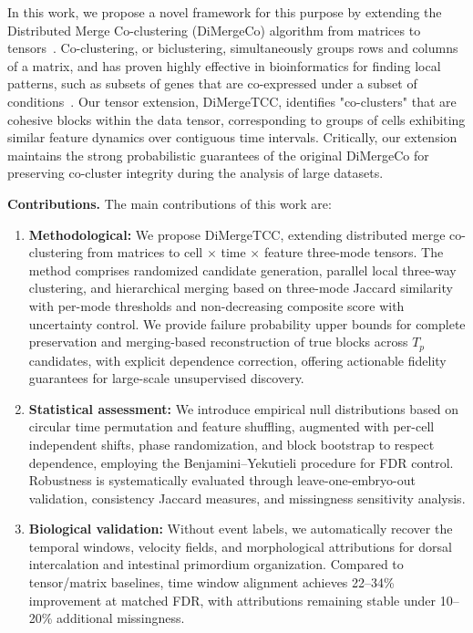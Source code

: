 \documentclass[unnumsec,webpdf,modern,large,namedate]{oup-authoring-template}%
\theoremstyle{thmstyleone}\newtheorem{theorem}{Theorem}
\theoremstyle{thmstyletwo}\newtheorem{example}{Example}
\theoremstyle{thmstylethree}\newtheorem{definition}{Definition}
\begin{document}
In this work, we propose a novel framework for this purpose by extending the Distributed Merge Co-clustering (DiMergeCo) algorithm from matrices to tensors~\citep{wu2024scalable}. Co-clustering, or biclustering, simultaneously groups rows and columns of a matrix, and has proven highly effective in bioinformatics for finding local patterns, such as subsets of genes that are co-expressed under a subset of conditions~\citep{hartigan1972DirectClusteringData,madeira2004BiclusteringAlgorithmsBiological}. Our tensor extension, DiMergeTCC, identifies "co-clusters" that are cohesive blocks within the data tensor, corresponding to groups of cells exhibiting similar feature dynamics over contiguous time intervals. Critically, our extension maintains the strong probabilistic guarantees of the original DiMergeCo for preserving co-cluster integrity during the analysis of large datasets.

\textbf{Contributions.} The main contributions of this work are:
\begin{enumerate}
\item \textbf{Methodological:} We propose DiMergeTCC, extending distributed merge co-clustering from matrices to cell $\times$ time $\times$ feature three-mode tensors. The method comprises randomized candidate generation, parallel local three-way clustering, and hierarchical merging based on three-mode Jaccard similarity with per-mode thresholds and non-decreasing composite score with uncertainty control. We provide failure probability upper bounds for complete preservation and merging-based reconstruction of true blocks across $T_p$ candidates, with explicit dependence correction, offering actionable fidelity guarantees for large-scale unsupervised discovery.
\item \textbf{Statistical assessment:} We introduce empirical null distributions based on circular time permutation and feature shuffling, augmented with per-cell independent shifts, phase randomization, and block bootstrap to respect dependence, employing the Benjamini--Yekutieli procedure for FDR control. Robustness is systematically evaluated through leave-one-embryo-out validation, consistency Jaccard measures, and missingness sensitivity analysis.
\item \textbf{Biological validation:} Without event labels, we automatically recover the temporal windows, velocity fields, and morphological attributions for dorsal intercalation and intestinal primordium organization. Compared to tensor/matrix baselines, time window alignment achieves 22--34\% improvement at matched FDR, with attributions remaining stable under 10--20\% additional missingness.
\end{enumerate}
\end{document}
